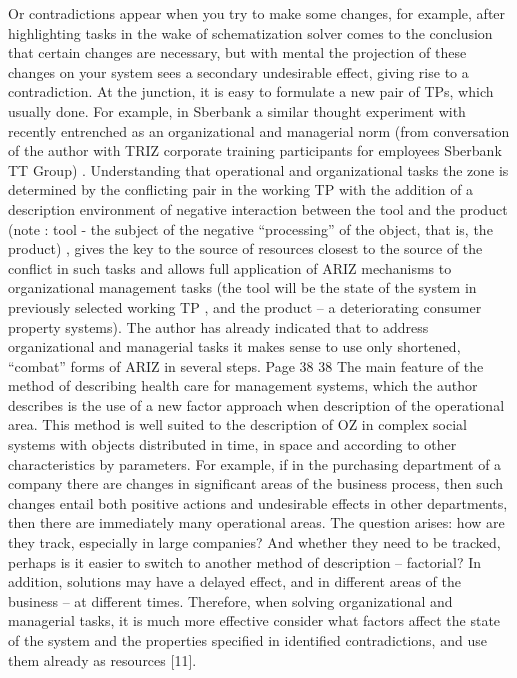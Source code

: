 Or contradictions appear when you try to make some
changes, for example, after highlighting tasks in the wake of schematization solver
comes to the conclusion that certain changes are necessary, but with mental
the projection of these changes on your system sees a secondary undesirable effect,
giving rise to a contradiction. At the junction, it is easy to formulate a new pair of TPs, which
usually done. For example, in Sberbank a similar thought experiment with
recently entrenched as an organizational and managerial norm (from
conversation of the author with TRIZ corporate training participants for employees
Sberbank TT Group) .
Understanding that operational and organizational tasks
the zone is determined by the conflicting pair in the working TP with the addition of a description
environment of negative interaction between the tool and the product (note : tool -
the subject of the negative “processing” of the object, that is, the product) , gives the key to
the source of resources closest to the source of the conflict in such tasks and
allows full application of ARIZ mechanisms to organizational
management tasks (the tool will be the state of the system in
previously selected working TP , and the product -- a deteriorating consumer property
systems). The author has already indicated that to address organizational and managerial
tasks it makes sense to use only shortened, “combat” forms of ARIZ in several
steps.
Page 38
38
The main feature of the method of describing health care for management systems,
which the author describes is the use of a new factor approach when
description of the operational area. This method is well suited to the description of OZ in complex
social systems with objects distributed in time, in space and
according to other characteristics by parameters. For example, if in the purchasing department of a company
there are changes in significant areas of the business process, then such changes
entail both positive actions and undesirable effects in other departments, then
there are immediately many operational areas. The question arises: how are they
track, especially in large companies? And whether they need to be tracked, perhaps
is it easier to switch to another method of description -- factorial? In addition, solutions may
have a delayed effect, and in different areas of the business -- at different times.
Therefore, when solving organizational and managerial tasks, it is much more effective
consider what factors affect the state of the system and the properties specified in
identified contradictions, and use them already as resources [11].

